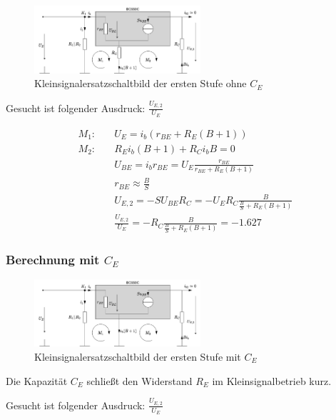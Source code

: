 \begin{figure}[H]
    \centering
    \includegraphics[width = 0.55\textwidth]{tex/1_Microphone/pictures/KKSESB_ohne_CE.pdf}
    \caption{Kleinsignalersatzschaltbild der ersten Stufe ohne $C_E$}
    \label{fig:my_label}
\end{figure}

Gesucht ist folgender Ausdruck: $\frac{U_{E,2}}{U_E}$

\begin{align*}
    M_1:& \quad U_E = i_b \left( r_{BE} + R_E \left( B + 1\right) \right) \\
    M_2:& \quad R_E i_b (B+1) + R_C i_b B = 0 \\
    {} & \quad U_{BE} = i_b r_{BE} = U_E \frac{r_{BE}}{r_{BE}+R_E(B+1)}\\
    {} & \quad r_{BE} \approx \frac{B}{S}\\
    {} & \quad U_{E,2} = - S U_{BE} R_C = - U_E R_C \frac{ B}{\frac{B}{S}+R_E(B+1)}\\
    & \quad \frac{U_{E,2}}{U_E} = - R_C \frac{B}{\frac{B}{S}+R_E(B+1)} = -1.627
\end{align*}

\subsubsection{Berechnung mit $C_E$}

\begin{figure}[H]
    \centering
    \includegraphics[width = 0.55\textwidth]{tex/1_Microphone/pictures/KKSESB_mit_CE.pdf}
    \caption{Kleinsignalersatzschaltbild der ersten Stufe mit $C_E$}
    \label{fig:my_label}
\end{figure}

Die Kapazität $C_E$ schließt den Widerstand $R_E$ im Kleinsignalbetrieb kurz.

Gesucht ist folgender Ausdruck: $\frac{U_{E,2}}{U_E}$

